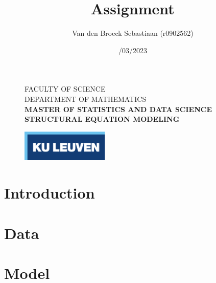 \documentclass[11pt]{article}
\title{\vspace*{40.0mm}
  \bf\sf Assignment
         \vspace*{20.0mm} \\
  \vspace*{40.0mm}}
\author{\sf Van den Broeck Sebastiaan (r0902562)}
\date{\sf 13/03/2023}
\begin{document}
\begin{figure}
  \parbox[t]{125mm}{
    \vspace*{6mm}
    \scriptsize\sf           FACULTY OF SCIENCE \\
    \scriptsize\sf           DEPARTMENT OF MATHEMATICS \\
    \scriptsize\sf\bfseries  MASTER OF STATISTICS AND DATA SCIENCE \\
    \scriptsize\sf\bfseries  STRUCTURAL EQUATION MODELING \\}
  \parbox[t]{40mm}{
    \begin{flushright}
      \includegraphics[height=15mm]{logo.eps.pdf}
    \end{flushright}}
\end{figure}

\maketitle
\thispagestyle{empty}
\raggedbottom

\cleardoublepage
\setcounter{page}{1}
\setcounter{tocdepth}{3}

\section{Introduction}
\section{Data}
\section{Model}
\end{document}
